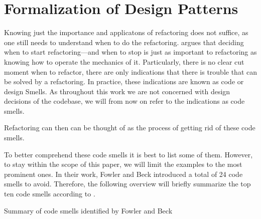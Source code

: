 \section{Formalization of Design Patterns}

Knowing just the importance and applicatons of refactoring does not suffice, 
	as one still needs to understand when to do the refactoring.
\textcite{fowler2018} argues that deciding when to start refactoring—and when to stop 
	is just as important to refactoring as knowing how to operate the mechanics of it.
Particularly, there is no clear cut moment when to refactor, 
	there are only indications that there is trouble that can be solved by a refactoring.
In practice, these indications are known as code or design Smells.
As throughout this work we are not concerned with design decisions of the codebase, 
	we will from now on refer to the indications as code smells.

Refactoring can then can be thought of as the process of getting rid of these code smells. 

To better comprehend these code smells it is best to list some of them. 
However, to stay within the scope of this paper, 
	we will limit the examples to the most prominent ones. 
In their work, Fowler and Beck introduced a total of 24 code smells to avoid.
Therefore, the following overview will briefly summarize the top ten code smells according to \textcite{lacerda2020}.

Summary of code smells identified by Fowler and Beck \textcite{fowler2018}

